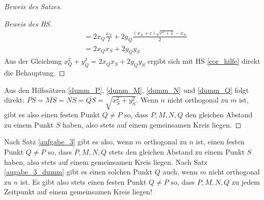 \begin{proof}[Beweis des Satzes]
\begin{proof}[Beweis des HS]
\begin{align*}
            &=2x_Q\frac{x_N}{2}+2y_Q\frac{(x_N+c)\sqrt{r^2+1}-x_N}{2}\\
            &=2x_Qx_S+2y_Qy_S
        \end{align*}
        Aus der Gleichung $x_Q^2+y_Q^2=2x_Qx_S+2y_Qy_S$ ergibt sich mit HS \ref{cor_hilfe} direkt die Behauptung.
    \end{proof}
    Aus den Hilfssätzen \ref{dumm_P}, \ref{dumm_M}, \ref{dumm_N} und \ref{dumm_Q} folgt direkt: 
    $\overline{PS}=\overline{MS}=\overline{NS}=\overline{QS}=\sqrt{x_S^2+y_S^2}$. Wenn $n$ nicht orthogonal zu $m$ 
    ist, gibt es also einen festen Punkt $Q\neq P$ so, dass $P, M, N, Q$ den gleichen Abstand zu einem Punkt $S$ 
    haben, also stets auf einem gemeinsamen Kreis liegen.
    \renewcommand{\qedsymbol}{$\blacksquare$}
\end{proof}

Nach Satz \ref{aufgabe_3} gibt es also,  wenn $m$ orthogonal zu $n$ ist, einen festen Punkt $Q\neq P$ so, dass $P, M, 
N, Q$ stets den gleichen Abstand zu einem Punkt $S$ haben, also stets auf einem gemeinsamen Kreis liegen. 
Nach Satz \ref{augabe_3_dumm} gibt es einen solchen Punkt $Q$ auch, wenn $m$ nicht orthogonal zu $n$ ist. Es gibt 
also stets einen festen Punkt $Q\neq P$ so, dass $P, M, N, Q$ zu jedem Zeitpunkt auf einem gemeinsamen Kreis liegen!